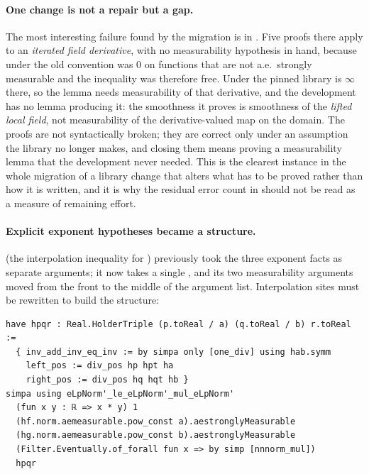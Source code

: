 \paragraph{One change is not a repair but a gap.} The most interesting failure
found by the migration is in . Five proofs there apply
 to an \emph{iterated field derivative}, with no
measurability hypothesis in hand, because under the old convention  was $0$ on
functions that are not a.e.\ strongly measurable and the inequality was therefore free. Under
the pinned library  is $\infty$ there, so the lemma needs measurability of that
derivative, and the development has no lemma producing it: the smoothness it proves is
smoothness of the \emph{lifted local field}, not measurability of the derivative-valued map on
the domain. The proofs are not syntactically broken; they are correct only under an
assumption the library no longer makes, and closing them means proving a measurability lemma
that the development never needed. This is the clearest instance in the whole migration of a
library change that alters what has to be proved rather than how it is written, and it is why
the residual error count in  should not be read as a measure of remaining
effort.

\paragraph{Explicit exponent hypotheses became a structure.}
 (the interpolation inequality for
) previously took the three exponent facts as separate arguments; it now takes
a single , and its two measurability arguments moved from the
front to the middle of the argument list. Interpolation sites must be rewritten to build the
structure:
\begin{lstlisting}
have hpqr : Real.HolderTriple (p.toReal / a) (q.toReal / b) r.toReal :=
  { inv_add_inv_eq_inv := by simpa only [one_div] using hab.symm
    left_pos := div_pos hp hpt ha
    right_pos := div_pos hq hqt hb }
simpa using eLpNorm'_le_eLpNorm'_mul_eLpNorm'
  (fun x y : ℝ => x * y) 1
  (hf.norm.aemeasurable.pow_const a).aestronglyMeasurable
  (hg.norm.aemeasurable.pow_const b).aestronglyMeasurable
  (Filter.Eventually.of_forall fun x => by simp [nnnorm_mul])
  hpqr
\end{lstlisting}

